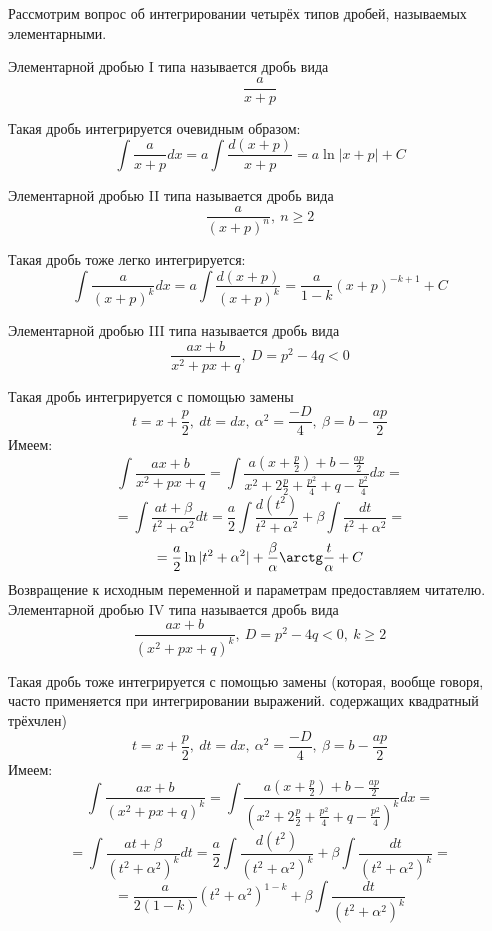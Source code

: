 Рассмотрим вопрос об интегрировании четырёх типов дробей, называемых элементарными.

\opred
Элементарной дробью I типа называется дробь вида
\begin{equation}\label{elem_drob_I}
\frac{a}{x+p}
\end{equation}

Такая дробь интегрируется очевидным образом:
$$
\int\frac{a}{x+p}dx=a\int\frac{d(x+p)}{x+p}=a\ln|x+p|+C
$$

\opred
Элементарной дробью II типа называется дробь вида
\begin{equation}\label{elem_drob_II}
\frac{a}{(x+p)^n},~n\geq 2
\end{equation}

Такая дробь тоже легко интегрируется:
$$
\int\frac{a}{(x+p)^k}dx=a\int\frac{d(x+p)}{(x+p)^k}=\frac{a}{1-k}(x+p)^{-k+1}+C
$$

\opred
Элементарной дробью III типа называется дробь вида
\begin{equation}\label{elem_drob_III}
\frac{ax+b}{x^2+px+q},~ D=p^2-4q<0
\end{equation}

Такая дробь интегрируется с помощью замены
\begin{equation}
t=x+\frac{p}{2},~ dt=dx, ~ \alpha^2=\frac{-D}{4}, ~\beta=b-\frac{ap}{2}
\end{equation}
Имеем:
$$
\int \frac{ax+b}{x^2+px+q}=\int\frac{a\left(x+\frac{p}{2}\right)+b-\frac{ap}{2}}{x^2+2\frac{p}{2}+\frac{p^2}{4}+q-\frac{p^2}{4}}dx=$$$$=
\int\frac{at+\beta}{t^2+\alpha^2}dt=\frac{a}{2}\int\frac{d(t^2)}{t^2+\alpha^2}+\beta\int\frac{dt}{t^2+\alpha^2}=$$$$=\frac{a}{2}\ln|t^2+\alpha^2|+\frac{\beta}{\alpha}\arctg\frac{t}{\alpha}+C
$$
Возвращение к исходным переменной и параметрам предоставляем читателю.
\opred
Элементарной дробью IV типа называется дробь вида
\begin{equation}\label{elem_drob_III}
\frac{ax+b}{(x^2+px+q)^k},~ D=p^2-4q<0,~k\geq 2
\end{equation}

Такая дробь тоже интегрируется с помощью замены (которая, вообще говоря, часто применяется при интегрировании выражений. содержащих квадратный трёхчлен)
\begin{equation}
t=x+\frac{p}{2},~ dt=dx, ~ \alpha^2=\frac{-D}{4}, ~\beta=b-\frac{ap}{2}
\end{equation}
Имеем:
$$
\int \frac{ax+b}{(x^2+px+q)^k}=
\int
	\frac	{a\left(x+\frac{p}{2}\right)+b-\frac{ap}{2}}
		{\left(x^2+2\frac{p}{2}+\frac{p^2}{4}+q-\frac{p^2}{4}\right)^k}
dx=
$$$$=
\int\frac{at+\beta}{(t^2+\alpha^2)^k}dt=
\frac{a}{2}\int\frac{d(t^2)}{(t^2+\alpha^2)^k}+\beta\int\frac{dt}{(t^2+\alpha^2)^k}=
$$$$=
\frac{a}{2(1-k)}(t^2+\alpha^2)^{1-k}+\beta\int\frac{dt}{(t^2+\alpha^2)^k}
$$

